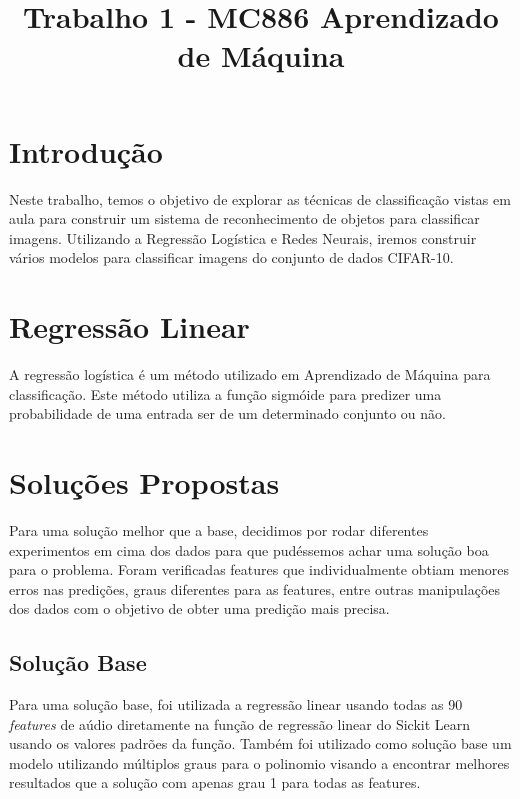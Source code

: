 \documentclass[conference]{IEEEtran}
\begin{document}
\title{Trabalho 1 - MC886 Aprendizado de Máquina}

\author{
\and
{}
}

\maketitle

\section{Introdução}


Neste trabalho, temos o objetivo de explorar as técnicas de classificação vistas em aula para construir um sistema de reconhecimento de objetos para classificar imagens. Utilizando a Regressão Logística e Redes Neurais, iremos construir vários modelos para classificar imagens do conjunto de dados CIFAR-10.

\section{Regressão Linear}
 
A regressão logística é um método utilizado em Aprendizado de Máquina para classificação. Este método utiliza a função sigmóide para predizer uma probabilidade de uma entrada ser de um determinado conjunto ou não.


\section{Soluções Propostas}
Para uma solução melhor que a base, decidimos por rodar diferentes experimentos em cima dos dados para que pudéssemos achar uma solução boa para o problema. Foram verificadas features que individualmente obtiam menores erros nas predições, graus diferentes para as features, entre outras manipulações dos dados com o objetivo de obter uma predição mais precisa.

\subsection{Solução Base}
Para uma solução base, foi utilizada a regressão linear usando todas as 90 \textit{features} de aúdio diretamente na função de regressão linear do Sickit Learn usando os valores padrões da função. Também foi utilizado como solução base um modelo utilizando múltiplos graus para o polinomio visando a encontrar melhores resultados que a solução com apenas grau 1 para todas as features. 
\end{document}
